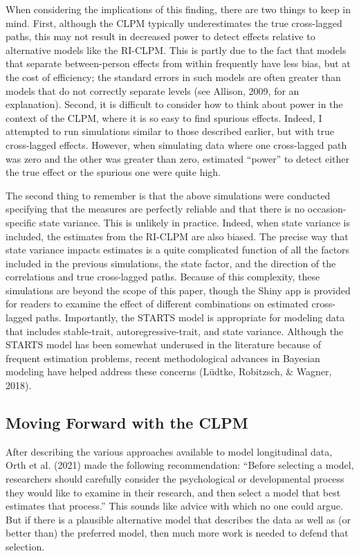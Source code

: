 \documentclass[
  english,
  man,floatsintext]{apa6}
\begin{document}
When considering the implications of this finding, there are two things to keep in mind. First, although the CLPM typically underestimates the true cross-lagged paths, this may not result in decreased power to detect effects relative to alternative models like the RI-CLPM. This is partly due to the fact that models that separate between-person effects from within frequently have less bias, but at the cost of efficiency; the standard errors in such models are often greater than models that do not correctly separate levels (see Allison, 2009, for an explanation). Second, it is difficult to consider how to think about power in the context of the CLPM, where it is so easy to find spurious effects. Indeed, I attempted to run simulations similar to those described earlier, but with true cross-lagged effects. However, when simulating data where one cross-lagged path was zero and the other was greater than zero, estimated ``power'' to detect either the true effect or the spurious one were quite high.

The second thing to remember is that the above simulations were conducted specifying that the measures are perfectly reliable and that there is no occasion-specific state variance. This is unlikely in practice. Indeed, when state variance is included, the estimates from the RI-CLPM are also biased. The precise way that state variance impacts estimates is a quite complicated function of all the factors included in the previous simulations, the state factor, and the direction of the correlations and true cross-lagged paths. Because of this complexity, these simulations are beyond the scope of this paper, though the Shiny app is provided for readers to examine the effect of different combinations on estimated cross-lagged paths. Importantly, the STARTS model is appropriate for modeling data that includes stable-trait, autoregressive-trait, and state variance. Although the STARTS model has been somewhat underused in the literature because of frequent estimation problems, recent methodological advances in Bayesian modeling have helped address these concerns (Lüdtke, Robitzsch, \& Wagner, 2018).

\hypertarget{moving-forward-with-the-clpm}{%
\subsection{Moving Forward with the CLPM}\label{moving-forward-with-the-clpm}}

After describing the various approaches available to model longitudinal data, Orth et al. (2021) made the following recommendation: ``Before selecting a model, researchers should carefully consider the psychological or developmental process they would like to examine in their research, and then select a model that best estimates that process.'' This sounds like advice with which no one could argue. But if there is a plausible alternative model that describes the data as well as (or better than) the preferred model, then much more work is needed to defend that selection.
\end{document}
